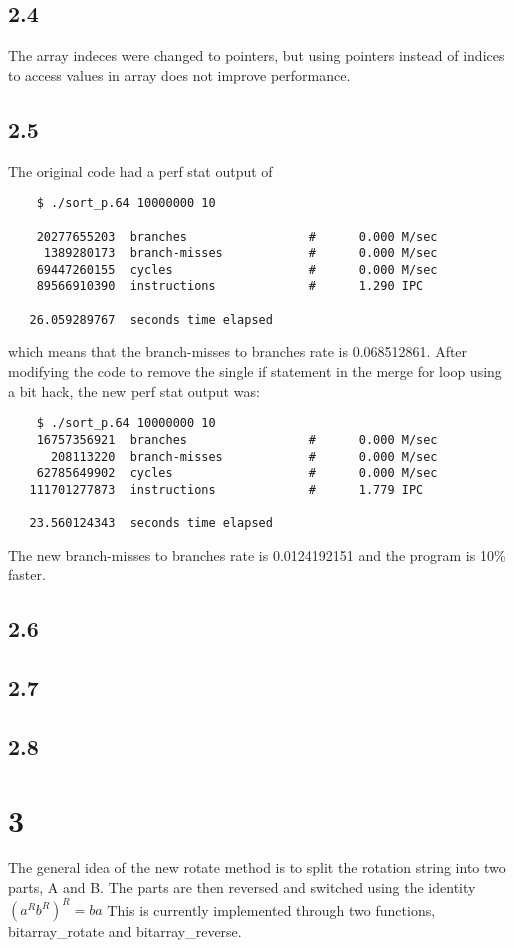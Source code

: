 \documentclass[12pt]{article}
\begin{document}
\subsection{2.4}
The array indeces were changed to pointers, but using pointers instead of 
indices to access values in array does not improve performance.

\subsection{2.5}
The original code had a perf stat output of 
\begin{verbatim}
    $ ./sort_p.64 10000000 10

    20277655203  branches                 #      0.000 M/sec
     1389280173  branch-misses            #      0.000 M/sec
    69447260155  cycles                   #      0.000 M/sec
    89566910390  instructions             #      1.290 IPC  

   26.059289767  seconds time elapsed
\end{verbatim}
which means that the branch-misses to branches rate is 0.068512861.  After 
modifying the code to remove the single if statement in the merge for loop 
using a bit hack, the new perf stat output was:
\begin{verbatim}
    $ ./sort_p.64 10000000 10
    16757356921  branches                 #      0.000 M/sec
      208113220  branch-misses            #      0.000 M/sec
    62785649902  cycles                   #      0.000 M/sec
   111701277873  instructions             #      1.779 IPC

   23.560124343  seconds time elapsed
\end{verbatim}
The new branch-misses to branches rate is 0.0124192151 and the program is 10\% 
faster.  
\subsection{2.6}

\subsection{2.7}

\subsection{2.8}

\section{3}
The general idea of the new rotate method is to split the rotation string into 
two parts, A and B.  The parts are then reversed and switched using the identity 
$(a^R b^R)^R = ba $  This is currently implemented through two functions, 
bitarray\_rotate and bitarray\_reverse.  
\end{document}

